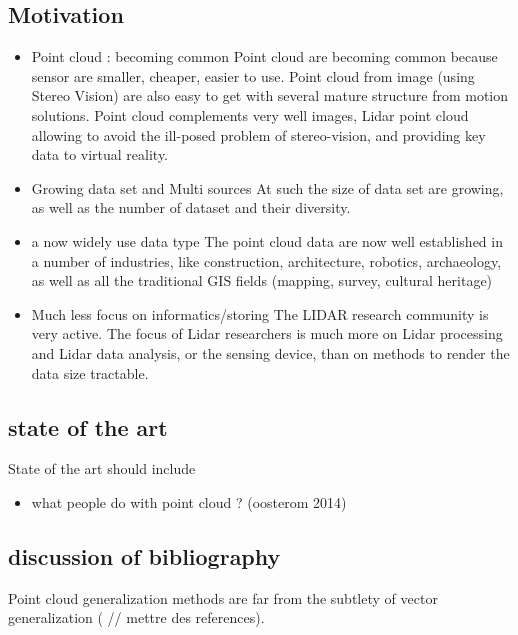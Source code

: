 	\subsection{Motivation}
		\begin{itemize}
			\item Point cloud : becoming common
				Point cloud are becoming common because sensor are smaller, cheaper, easier to use. Point cloud from image (using Stereo Vision) are also easy to get with several mature structure from motion solutions.
				Point cloud complements very well images, Lidar point cloud allowing to avoid the ill-posed problem of stereo-vision, and providing key data to virtual reality.
			\item Growing data set and Multi sources 
				At such the size of data set are growing, as well as the number of dataset and their diversity.
			\item a now widely use data type
				The point cloud data are now well established in a number of industries, like construction, architecture, robotics, archaeology, as well as all the traditional GIS fields (mapping, survey, cultural heritage)
			\item Much less focus on informatics/storing 
				The LIDAR research community is very active. The focus of Lidar researchers is much more on Lidar processing and Lidar data analysis, or the sensing device, than on methods to render the data size tractable. 
		\end{itemize}   
		
	\subsection{state of the art}
		State of the art should include 
		\begin{itemize}
			\item what people do with point cloud ? (oosterom 2014)
		\end{itemize}
	\subsection{discussion of bibliography} 
		
		Point cloud generalization methods are far from the subtlety of vector generalization ( // mettre des references).
		
